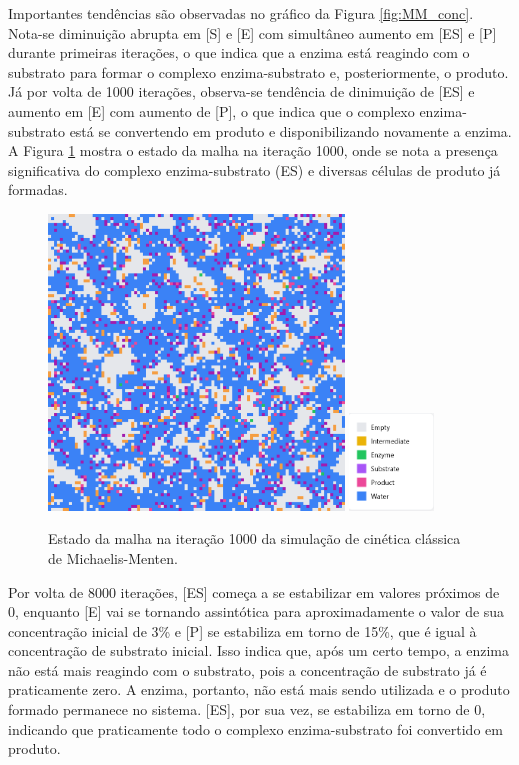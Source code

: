 \documentclass[12pt,oneside]{report}
\begin{document}
Importantes tendências são observadas no gráfico da Figura \ref{fig:MM_conc}. Nota-se diminuição abrupta em [S] e [E] com simultâneo aumento em [ES] e [P] durante primeiras iterações, o que indica que a enzima está reagindo com o substrato para formar o complexo enzima-substrato e, posteriormente, o produto. Já por volta de 1000 iterações, observa-se tendência de dinimuição de [ES] e aumento em [E] com aumento de [P], o que indica que o complexo enzima-substrato está se convertendo em produto e disponibilizando novamente a enzima. A Figura \ref{fig:MM_1000it} mostra o estado da malha na iteração 1000, onde se nota a presença significativa do complexo enzima-substrato (ES) e diversas células de produto já formadas.

\begin{figure}[H]
    \centering
    \includegraphics[width=0.7\textwidth]{img/MM_1000it_S0.png}
    \hspace{0.05\textwidth}
    \includegraphics[width=0.2\textwidth]{img/legend.png}
    \caption{\small Estado da malha na iteração 1000 da simulação de cinética clássica de Michaelis-Menten.}
    \label{fig:MM_1000it}
\end{figure}

Por volta de 8000 iterações, [ES] começa a se estabilizar em valores próximos de 0, enquanto [E] vai se tornando assintótica para aproximadamente o valor de sua concentração inicial de 3\% e [P] se estabiliza em torno de 15\%, que é igual à concentração de substrato inicial. Isso indica que, após um certo tempo, a enzima não está mais reagindo com o substrato, pois a concentração de substrato já é praticamente zero. A enzima, portanto, não está mais sendo utilizada e o produto formado permanece no sistema. [ES], por sua vez, se estabiliza em torno de 0, indicando que praticamente todo o complexo enzima-substrato foi convertido em produto.
\end{document}
